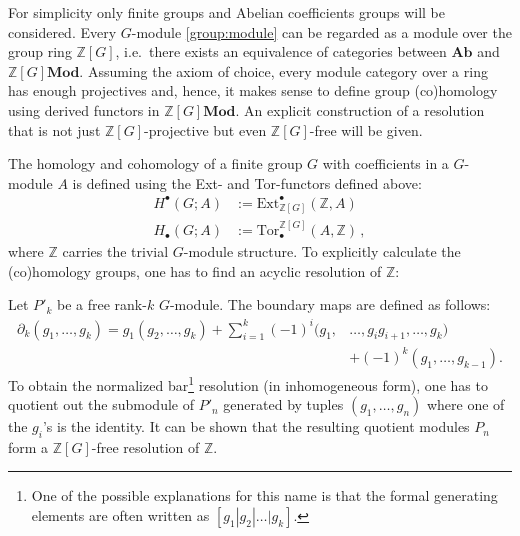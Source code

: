 	For simplicity only finite groups and Abelian coefficients groups will be considered. Every $G$-module \ref{group:module} can be regarded as a module over the group ring $\mathbb{Z}[G]$, i.e.~there exists an equivalence of categories between $\mathbf{Ab}$ and $\mathbb{Z}[G]\mathbf{Mod}$. Assuming the axiom of choice, every module category over a ring has enough projectives and, hence, it makes sense to define group (co)homology using derived functors in $\mathbb{Z}[G]\mathbf{Mod}$. An explicit construction of a resolution that is not just $\mathbb{Z}[G]$-projective but even $\mathbb{Z}[G]$-free will be given.

	The homology and cohomology of a finite group $G$ with coefficients in a $G$-module $A$ is defined using the Ext- and Tor-functors defined above:
	\begin{align}
		H^\bullet(G;A) &:= \mathrm{Ext}_{\mathbb{Z}[G]}^\bullet(\mathbb{Z},A)\\
		H_\bullet(G;A) &:= \mathrm{Tor}^{\mathbb{Z}[G]}_\bullet(A,\mathbb{Z})\,,
	\end{align}
	where $\mathbb{Z}$ carries the trivial $G$-module structure. To explicitly calculate the (co)homology groups, one has to find an acyclic resolution of $\mathbb{Z}$:
	\begin{construct}
		Let $P'_k$ be a free rank-$k$ $G$-module. The boundary maps are defined as follows:
		\begin{align}
			\label{homalg:group_boundary}
			\partial_k(g_1,\ldots,g_k) = g_1(g_2,\ldots,g_k) + \sum_{i=1}^k (-1)^i(g_1,&\ldots,g_ig_{i+1},\ldots,g_k)\\
             &+ (-1)^k(g_1,\ldots,g_{k-1}).\nonumber
		\end{align}
		To obtain the normalized bar\footnote{One of the possible explanations for this name is that the formal generating elements are often written as $[g_1|g_2|\ldots|g_k]$.} resolution (in inhomogeneous form), one has to quotient out the submodule of $P'_n$ generated by tuples $(g_1,\ldots,g_n)$ where one of the $g_i$'s is the identity. It can be shown that the resulting quotient modules $P_n$ form a $\mathbb{Z}[G]$-free resolution of $\mathbb{Z}$.
	\end{construct}

